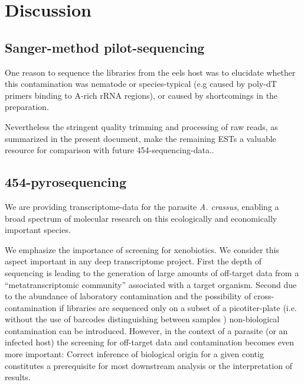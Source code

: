
\chapter{Discussion} %



\ifpdf
    \graphicspath{{7/figures/PNG/}{7/figures/PDF/}{7/figures/}}
\else
    \graphicspath{{7/figures/EPS/}{7/figures/}}
\fi



\section{Sanger-method pilot-sequencing}
\label{sec:sanger-pil}

One reason to sequence the libraries from the eels host was to
elucidate whether this contamination was nematode or species-typical
(e.g caused by poly-dT primers binding to A-rich rRNA regions), or
caused by shortcomings in the preparation.

Nevertheless the stringent quality trimming and processing of raw
reads, as summarized in the present document, make the remaining ESTs
a valuable resource for comparison with future 454-sequencing-data..

\section{454-pyrosequencing}
\label{sec:454-pyr}


We are providing transcriptome-data for the parasite
\textit{A. crassus}, enabling a broad spectrum of molecular research
on this ecologically and economically important species.

We emphasize the importance of screening for xenobiotics. We consider
this aspect important in any deep transcriptome project. First the
depth of sequencing is leading to the generation of large amounts of
off-target data from a ``metatranscriptomic community'' associated with a
target organism. Second due to the abundance of laboratory
contamination and the possibility of cross-contamination if libraries
are sequenced only on a subset of a picotiter-plate (i.e. without the
use of barcodes distinguishing between samples \cite{pmid20137071})
non-biological contamination can be introduced. 
However, in the context of a parasite (or an infected host) the
screening for off-target data and contamination becomes even more
important: Correct inference of biological origin for a given contig
constitutes a prerequisite for most downstream analysis or the
interpretation of results.

